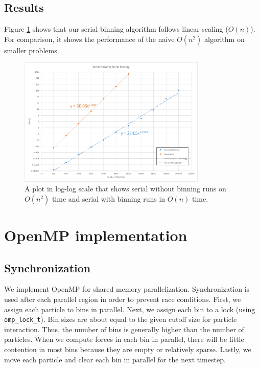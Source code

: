 \documentclass[12pt]{article}
\begin{document}
\subsection{Results}
Figure \ref{fig:serial-on} shows that our serial binning algorithm follows linear scaling ($O(n)$). For comparison, it shows the performance of the naive $O(n^2)$ algorithm on smaller problems.

\begin{figure}
	\centering
 \includegraphics[width=0.8\textwidth]{graphs/serial_binning_vs_naive.png}
  \caption{A plot in log-log scale that shows serial without binning runs on $O(n^2)$ time and serial with binning runs in $O(n)$ time.}
  \label{fig:serial-on}
\end{figure}

\section{OpenMP implementation}

\subsection{Synchronization}

We implement OpenMP for shared memory parallelization. Synchronization is used after each parallel region in order to prevent race conditions. First, we assign each particle to bins in parallel. Next, we assign each bin to a lock (using \texttt{omp\_lock\_t}). Bin sizes are about equal to the given cutoff size for particle interaction. Thus, the number of bins is generally higher than the number of particles. When we compute forces in each bin in parallel, there will be little contention in most bins because they are empty or relatively sparse. Lastly, we move each particle and clear each bin in parallel for the next timestep. 
\end{document}
